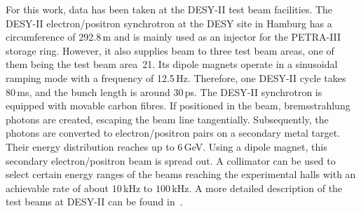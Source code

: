 
For this work, data has been taken at the {DESY-II} test beam facilities. 
The DESY-II electron/positron synchrotron at the DESY site in Hamburg has a circumference of 292.8\,m and is mainly used as an injector for the PETRA-III storage ring. 
However, it also supplies beam to three test beam areas, one  of them being the test beam area~21.
Its dipole magnets operate in a sinusoidal ramping mode with a frequency of 12.5\,Hz. 
Therefore, one DESY-II cycle takes 80\,ms, and the bunch length is around 30\,ps. 
The DESY-II synchrotron is equipped with movable carbon fibres. 
If positioned in the beam, bremsstrahlung photons are created, escaping the beam line tangentially.
Subsequently, the photons are converted to electron/positron pairs on a secondary metal target. 
Their energy distribution reaches up to 6\,GeV. 
Using a dipole magnet, this secondary electron/positron beam is spread out.
A collimator can be used to select certain energy ranges of the beams reaching the experimental halls with an achievable rate of about $10$\,kHz to $100$\,kHz. 
A more detailed description of the test beams at {DESY-II} can be found in~\cite{EUDET-2007-11}.



